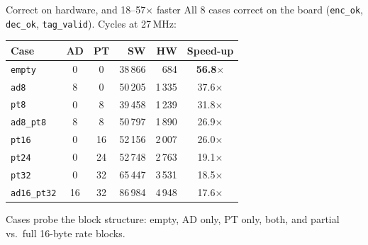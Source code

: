 \documentclass[aspectratio=169,11pt]{beamer}
\newcommand{\code}[1]{\texttt{\small #1}}
\begin{document}
\begin{frame}{Correct on hardware, and 18--57$\times$ faster}
\small All 8 cases correct on the board (\code{enc\_ok}, \code{dec\_ok},
\code{tag\_valid}). Cycles at 27\,MHz:
\begin{center}
\renewcommand{\arraystretch}{1.05}
\begin{tabular}{lccrrc}
\toprule
\textbf{Case} & \textbf{AD} & \textbf{PT} & \textbf{SW} & \textbf{HW} & \textbf{Speed-up}\\
\midrule
\code{empty}     & 0  & 0  & 38\,866 & 684   & \textbf{56.8}$\times$\\
\code{ad8}       & 8  & 0  & 50\,205 & 1\,335 & 37.6$\times$\\
\code{pt8}       & 0  & 8  & 39\,458 & 1\,239 & 31.8$\times$\\
\code{ad8\_pt8}  & 8  & 8  & 50\,797 & 1\,890 & 26.9$\times$\\
\code{pt16}      & 0  & 16 & 52\,156 & 2\,007 & 26.0$\times$\\
\code{pt24}      & 0  & 24 & 52\,748 & 2\,763 & 19.1$\times$\\
\code{pt32}      & 0  & 32 & 65\,447 & 3\,531 & 18.5$\times$\\
\code{ad16\_pt32}& 16 & 32 & 86\,984 & 4\,948 & 17.6$\times$\\
\bottomrule
\end{tabular}
\end{center}
{\small Cases probe the block structure: empty, AD only, PT only, both, and
partial vs.\ full 16-byte rate blocks.}
\end{frame}
\end{document}
